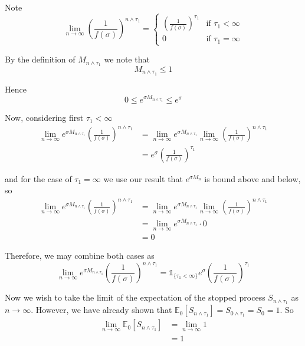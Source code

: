 \documentclass[12pt]{article}
\newlength\tindent
\renewcommand{\indent}{\hspace*{\tindent}}
\newcommand{\E}{\mathbb E}
\begin{document}
Note
\begin{equation*}
	\lim_{n\to\infty} \left( \frac{1}{f(\sigma)} \right)^{n\land\tau_1} =
	\begin{cases}
		\left( \frac{1}{f(\sigma)} \right)^{\tau_1} & \text{if } \tau_1 < \infty \\
		0 & \text{if } \tau_1 = \infty
	\end{cases}
\end{equation*}

By the definition of $M_{n\land\tau_1}$ we note that
\begin{equation*}
	M_{n\land\tau_1} \leq 1
\end{equation*}

Hence
\begin{equation*}
	0 \leq e^{\sigma M_{n\land\tau_1}} \leq e^\sigma
\end{equation*}

Now, considering first $\tau_1 < \infty$
\begin{align*}
	\lim_{n\to\infty} e^{\sigma M_{n\land\tau_1}} \left( \frac{1}{f(\sigma)} \right)^{n\land\tau_1} &= \lim_{n\to\infty} e^{\sigma M_{n\land\tau_1}} \lim_{n\to\infty} \left( \frac{1}{f(\sigma)} \right)^{n\land\tau_1} \\
	&= e^\sigma \left( \frac{1}{f(\sigma)} \right)^{\tau_1}
\end{align*}

and for the case of $\tau_1 = \infty$ we use our result that $e^{\sigma M_n}$ is bound above and below, so
\begin{align*}
	\lim_{n\to\infty} e^{\sigma M_{n\land\tau_1}} \left( \frac{1}{f(\sigma)} \right)^{n\land\tau_1} &= \lim_{n\to\infty} e^{\sigma M_{n\land\tau_1}} \lim_{n\to\infty} \left( \frac{1}{f(\sigma)} \right)^{n\land\tau_1} \\
	&= \lim_{n\to\infty} e^{\sigma M_{n\land\tau_1}} \cdot 0 \\
	&= 0
\end{align*}

Therefore, we may combine both cases as
\begin{equation*}
\lim_{n\to\infty} e^{\sigma M_{n\land\tau_1}} \left( \frac{1}{f(\sigma)} \right)^{n\land\tau_1} = \mathds 1_{\{ \tau_1 < \infty \}} e^\sigma \left( \frac{1}{f(\sigma)} \right)^{\tau_1}
\end{equation*}

\indent Now we wish to take the limit of the expectation of the stopped process $S_{n\land\tau_1}$ as $n \to \infty$. However, we have already shown that $\E_0[S_{n\land\tau_1}] = S_{0 \land \tau_1} = S_0 = 1$. So
\begin{align*}
	\lim_{n\to\infty} \E_0[S_{n\land\tau_1}] &= \lim_{n\to\infty} 1 \\
	&= 1
\end{align*}
\end{document}

